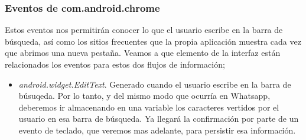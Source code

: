 \documentclass[12pt,a4paper,oneside]{book} %
\begin{document}
\subsubsection{Eventos de com.android.chrome}
Estos eventos nos permitirán conocer lo que el usuario escribe en la barra de búsqueda, así como los sitios frecuentes que la propia aplicación muestra cada vez que abrimos una nueva pestaña. 
\newline 
\newline 
Veamos a que elemento de la interfaz están relacionados los eventos para estos dos flujos de información; 
\begin{itemize}
\item \textit{android.widget.EditText}. Generado cuando el usuario escribe en la barra de búsuqeda. Por lo tanto, y del mismo modo que ocurría en Whatsapp, deberemos ir almacenando en una variable los caracteres vertidos por el usuario en esa barra de búsqueda. Ya llegará la confirmación por parte de un evento de teclado, que veremos mas adelante, para persistir esa información. 
\begin{figure}[H]
	\begin{center}

\end{center}
\end{figure}
\end{itemize}
\end{document}
